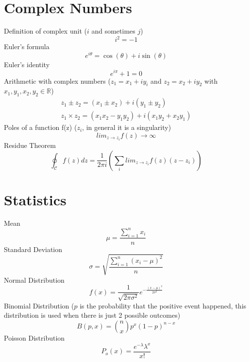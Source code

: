 \documentclass{article}
\begin{document}
\section{Complex Numbers}
Definition of complex unit ($i$ and sometimes $j$)
\begin{equation}
  i^2 = -1
\end{equation}
Euler's formula
\begin{equation}
  e^{i\theta} = \cos(\theta) + i\sin(\theta)
\end{equation}
Euler's identity
\begin{equation}
  e^{i\pi}+1=0
\end{equation}
Arithmetic with complex numbers ($z_1 = x_1 + iy_i$ and $z_2 = x_2 + iy_2$ with $x_1,y_1,x_2,y_2 \in \mathbb{R}$)
\begin{equation}
  \begin{split}
    z_1 \pm z_2  = (x_1 \pm x_2) + i(y_1 \pm y_2)\\
    z_1\times z_2 = (x_1x_2 - y_1y_2) + i(x_1y_2 + x_2y_1)
  \end{split}
\end{equation}
Poles of a function f(z) ($z_i$, in general it is a singularity)
\begin{equation}
  lim_{z \to z_i}f(z) \to \infty
\end{equation}
Residue Theorem
\begin{equation}
  \oint_{\mathscr{C}} f(z) dz = \frac{1}{2\pi i}(\sum_i lim_{z \to z_i} f(z)(z-z_i))
\end{equation}

\section{Statistics}
Mean
\begin{equation}
  \mu = \frac{\sum_{i=1}^n x_i}{n}
\end{equation}
Standard Deviation
\begin{equation}
  \sigma = \sqrt{\frac{\sum_{i=1}^n(x_i - \mu)^2}{n}}
\end{equation}
Normal Distribution
\begin{equation}
  f(x) = \frac{1}{\sqrt{2\pi \sigma^2}} e^{-\frac{(x-\mu)^2}{2\sigma^2}}
\end{equation}
Binomial Distribution ($p$ is the probability that the positive event happened, this distribution is used when there is just 2 possible outcomes)
\begin{equation}
  B(p,x) = \binom{n}{x}p^x(1-p)^{n-x}
\end{equation}
Poisson Distribution
\begin{equation}
  P_o(x) = \frac{e^{-\lambda}\lambda^x}{x!}
\end{equation}
\end{document}
